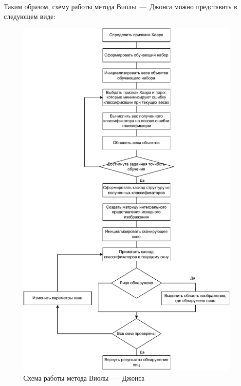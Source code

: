 Таким образом, схему работы метода Виолы~---~Джонса можно представить в следующем виде:

\begin{figure}[h]
\begin{center}
    \includegraphics[height=0.95\textheight,page=1]{img/viola_jones_scheme.pdf}
\end{center}
\captionsetup{justification=centering}
\caption{Схема работы метода Виолы~---~Джонса}
\end{figure}
